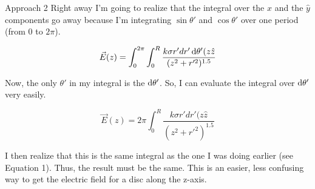 \begin{homeworkProblem}
\begin{homeworkSection}{Approach 2}
       Right away I'm going to realize that the integral over the
       $\hat{x}$ and the $\hat{y}$ components go away because I'm
       integrating $\sin\theta'$ and $\cos\theta'$ over one period (from
       0 to $2\pi$).

        \[ \vec{E}(z) = \int_0^{2\pi} \int_0^R \frac{k \sigma r' dr'
        \mathop{}\!\mathrm{d} \theta' (z \hat{z} }{(z^2+r'^2)^{1.5}}
        \]

        Now, the only $\theta'$ in my integral is the $\mathop{}\!\mathrm{d} \theta'$.
        So, I can evaluate the integral over $\mathop{}\!\mathrm{d} \theta'$ very
        easily. 

        \[ \vec{E}(z) = 2\pi \int_0^R \frac{k \sigma r' dr'
        (z \hat{z} }{(z^2+r'^2)^{1.5}}
        \]

        I then realize that this is the same integral as the one I was
        doing earlier (see Equation 1). Thus, the result must be the
        same. This is an easier, less confusing way to get the electric
        field for a disc along the z-axis.

    \end{homeworkSection}    
\end{homeworkProblem}
